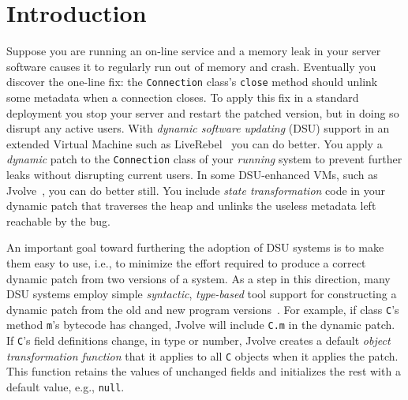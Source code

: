 \documentclass[natbib]{sigplanconf}
\newcommand{\code}[1]{\lstinline|#1|\xspace}
\begin{document}



\section{Introduction}

Suppose you are running an on-line service and a memory leak in your
server software causes it to regularly run out of memory and
crash.  Eventually you discover the one-line fix: the
\code{Connection} class's \code{close} method should
unlink some metadata when a connection closes.  To apply this
fix in a standard deployment you stop your server and restart
the patched version, but in doing so disrupt any active users.  With 
\emph{dynamic software updating} (DSU) support in an extended Virtual Machine
such as LiveRebel~\cite{javarebel} you
can do better. You apply a \emph{dynamic} patch 
to the \code{Connection} class of your \emph{running}
system to prevent further leaks without disrupting current users.
In some DSU-enhanced VMs, such as Jvolve~\cite{jvolve}, you can do better
still. You include \emph{state 
  transformation} code in your dynamic patch that traverses the
heap and unlinks the useless metadata left reachable by the bug.


An important goal toward furthering the adoption of DSU systems is to
make them easy to use, i.e., to minimize the effort required to
produce a correct dynamic patch from two versions of a system.  As a
step in this direction, many DSU systems employ simple
\emph{syntactic}, \emph{type-based} tool support for constructing a
dynamic patch from the old and new program
versions~\cite{jvolve,ksplice,neamtiu06dsu, HicksNettles03}.  For
example, if class \code{C}'s method \code{m}'s bytecode has changed, Jvolve
will include \code{C.m} in the dynamic patch.  If \code{C}'s field
definitions change, in type or number, Jvolve creates a default
\emph{object transformation function} that it  applies to all
\code{C} objects when it applies the patch. This function retains
the values of unchanged fields and initializes the rest with a default
value, e.g., \code{null}.
\end{document}
